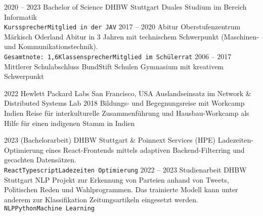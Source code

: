 \documentclass[9pt]{developercv} %
\begin{document}

\begin{entrylist}
	\entry
	{2020 -- 2023}
	{Bachelor of Science}
	{DHBW Stuttgart}
	{Duales Studium im Bereich Informatik\\ \texttt{Kurssprecher}\slashsep\texttt{Mitglied in der JAV}}
	\entry
	{2017 -- 2020}
	{Abitur}
	{Oberstufenzentrum Märkisch Oderland}
	{Abitur in 3 Jahren mit technischem Schwerpunkt (Maschinen- und Kommunikationstechnik).\\ \texttt{Gesamtnote: 1,6}\slashsep\texttt{Klassensprecher}\slashsep\texttt{Mitglied im Schülerrat}}
	\entry
	{2006 -- 2017}
	{Mittlerer Schulabschluss}
	{BundStift Schulen}
	{Gymnasium mit kreativem Schwerpunkt}
\end{entrylist}


\newpage


\begin{entrylist}
	\entry
	{2022}
	{Hewlett Packard Labs}
	{San Francisco, USA}
	{Auslandseinsatz im Network \& Distributed Systems Lab}
	\entry
	{2018}
	{Bildungs- und Begegnungsreise mit Workcamp}
	{Indien}
	{Reise für interkulturelle Zusammenführung und Hausbau-Workcamp als Hilfe für einen indigenen Stamm in Indien}
\end{entrylist}



\begin{entrylist}
  \entry
	{2023}
	{(Bachelorarbeit)}
	{DHBW Stuttgart \& Poinnext Services (HPE)}
	{Ladezeiten-Optimierung eines React-Frontends mittels adaptiven Backend-Filterring und gecachten Datensätzen.\\ \texttt{React}\slashsep\texttt{Typescript}\slashsep\texttt{Ladezeiten Optimierung}}
	\entry
	{2022 --  2023}
	{Studienarbeit}
	{DHBW Stuttgart}
	{NLP Projekt zur Erkennung von Parteien anhand von Tweets, Politischen Reden und Wahlprogrammen. Das trainierte Modell kann unter anderem zur Klassifikation Zeitungsartikeln eingesetzt werden.\\ \texttt{NLP}\slashsep\texttt{Python}\slashsep\texttt{Machine Learning}}
\end{entrylist}
\end{document}

